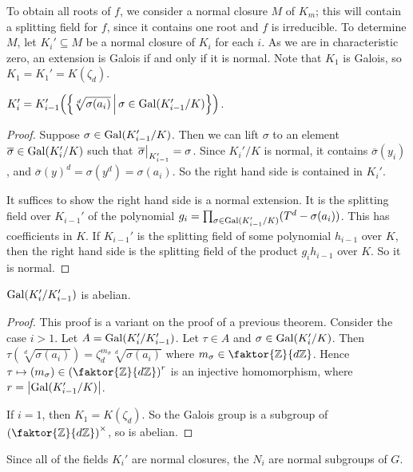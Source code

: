 To obtain all roots of \( f \), we consider a normal closure \( M \) of \( K_m \); this will contain a splitting field for \( f \), since it contains one root and \( f \) is irreducible.
To determine \( M \), let \( K_i' \subseteq M \) be a normal closure of \( K_i \) for each \( i \).
As we are in characteristic zero, an extension is Galois if and only if it is normal.
Note that \( K_1 \) is Galois, so \( K_1 = K_1' = K(\zeta_d) \).
\begin{proposition}
	\( K_i' = K_{i-1}'\qty(\qty{\sqrt[d]{\sigma(a_i)} \,\middle|\,\sigma \in \operatorname{Gal}(K_{i-1}'/K)}) \).
\end{proposition}
\begin{proof}
	Suppose \( \sigma \in \operatorname{Gal}(K_{i-1}'/K) \).
	Then we can lift \( \sigma \) to an element \( \overline \sigma \in \operatorname{Gal}(K_i'/K) \) such that \( \eval{\overline\sigma}_{K_{i-1}'} = \sigma \).
	Since \( K_i' / K \) is normal, it contains \( \overline \sigma(y_i) \), and \( \overline \sigma(y)^d = \sigma(y^d) = \sigma(a_i) \).
	So the right hand side is contained in \( K_i' \).

	It suffices to show the right hand side is a normal extension.
	It is the splitting field over \( K_{i-1}' \) of the polynomial \( g_i = \prod_{\sigma \in \operatorname{Gal}(K_{i-1}'/K)} (T^d - \sigma(a_i)) \).
	This has coefficients in \( K \).
	If \( K_{i-1}' \) is the splitting field of some polynomial \( h_{i-1} \) over \( K \), then the right hand side is the splitting field of the product \( g_i h_{i-1} \) over \( K \).
	So it is normal.
\end{proof}
\begin{proposition}
	\( \operatorname{Gal}(K_i'/K_{i-1}') \) is abelian.
\end{proposition}
\begin{proof}
	This proof is a variant on the proof of a previous theorem.
	Consider the case \( i > 1 \).
	Let \( A = \operatorname{Gal}(K_i'/K_{i-1}') \).
	Let \( \tau \in A \) and \( \sigma \in \operatorname{Gal}(K_i'/K) \).
	Then \( \tau(\sqrt[d]{\sigma(a_i)}) = \zeta_d^{m_\sigma} \sqrt[d]{\sigma(a_i)} \) where \( m_\sigma \in \faktor{\mathbb Z}{d\mathbb Z} \).
	Hence \( \tau \mapsto (m_\sigma) \in \qty(\faktor{\mathbb Z}{d\mathbb Z})^r \) is an injective homomorphism, where \( r = \abs{\operatorname{Gal}(K_{i-1}'/K)} \).

	If \( i = 1 \), then \( K_1 = K(\zeta_d) \).
	So the Galois group is a subgroup of \( \qty(\faktor{\mathbb Z}{d\mathbb Z})^\times \), so is abelian.
\end{proof}
Since all of the fields \( K_i' \) are normal closures, the \( N_i \) are normal subgroups of \( G \).
